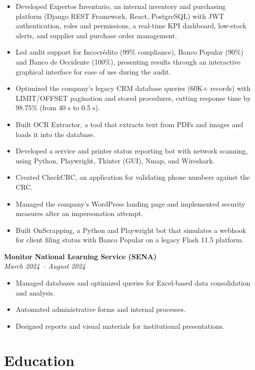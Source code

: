\documentclass[11pt,a4paper]{article}
\begin{document}
\begin{itemize}
    \item Developed Expertos Inventario, an internal inventory and purchasing platform (Django REST Framework, React, PostgreSQL) with JWT authentication, roles and permissions, a real-time KPI dashboard, low-stock alerts, and supplier and purchase order management.
    \item Led audit support for Incocrédito (99\% compliance), Banco Popular (90\%) and Banco de Occidente (100\%), presenting results through an interactive graphical interface for ease of use during the audit.
    \item Optimized the company's legacy CRM database queries (60K+ records) with LIMIT/OFFSET pagination and stored procedures, cutting response time by 98.75\% (from 40 s to 0.5 s).
    \item Built OCR Extractor, a tool that extracts text from PDFs and images and loads it into the database.
    \item Developed a service and printer status reporting bot with network scanning, using Python, Playwright, Tkinter (GUI), Nmap, and Wireshark.
    \item Created CheckCRC, an application for validating phone numbers against the CRC.
    \item Managed the company's WordPress landing page and implemented security measures after an impersonation attempt.
    \item Built OnScrapping, a Python and Playwright bot that simulates a webhook for client filing status with Banco Popular on a legacy Flash 11.5 platform.
\end{itemize}

\vspace{0.2cm}

\textbf{Monitor} \hfill \textbf{National Learning Service (SENA)}\\
\textit{March 2024 -- August 2024}

\begin{itemize}
    \item Managed databases and optimized queries for Excel-based data consolidation and analysis.
    \item Automated administrative forms and internal processes.
    \item Designed reports and visual materials for institutional presentations.
\end{itemize}

\section*{Education}
\end{document}
